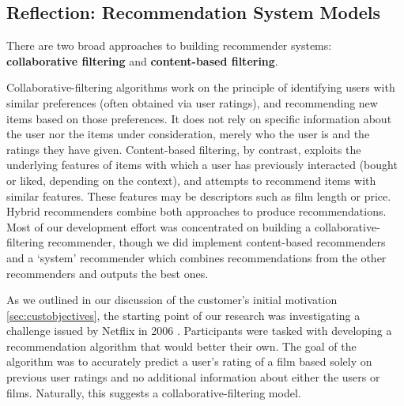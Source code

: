 \documentclass{l3proj}
\begin{document}
\subsection{Reflection: Recommendation System Models}
\label{sec:modelreflection}

There are two broad approaches to building recommender systems: \textbf{collaborative filtering} and \textbf{content-based filtering}. 

Collaborative-filtering algorithms work on the principle of identifying users with similar preferences (often obtained via user ratings), and recommending new items based on those preferences. It does not rely on specific information about the user nor the items under consideration, merely who the user is and the ratings they have given. Content-based filtering, by contrast, exploits the underlying features of items with which a user has previously interacted (bought or liked, depending on the context), and attempts to recommend items with similar features. These features may be descriptors such as film length or price. Hybrid recommenders combine both approaches to produce recommendations. Most of our development effort was concentrated on building a collaborative-filtering recommender, though we did implement content-based recommenders and a `system' recommender which combines recommendations from the other recommenders and outputs the best ones. 

As we outlined in our discussion of the customer’s initial motivation \ref{sec:custobjectives}, the starting point of our research was investigating a challenge issued by Netflix in 2006 \cite{NetflixPrize}. Participants were tasked with developing a recommendation algorithm that would better their own. The goal of the algorithm was to accurately predict a user's rating of a film based solely on previous user ratings and no additional information about either the users or films. Naturally, this suggests a collaborative-filtering model.
\end{document}
